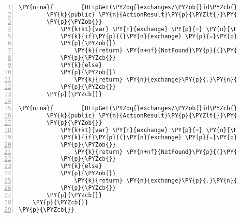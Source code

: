 \begin{Verbatim}[commandchars=\\\{\},numbers=left,firstnumber=1,stepnumber=1,numberblanklines=0]
\PY{n+na}{        [HttpGet(\PYZdq{}exchanges/\PYZob{}id\PYZcb{}/stats/endDate/\PYZob{}endDate\PYZcb{}\PYZdq{})]}
        \PY{k}{public} \PY{n}{ActionResult}\PY{p}{\PYZlt{}}\PY{n}{List}\PY{p}{\PYZlt{}}\PY{n}{Stat}\PY{p}{\PYZgt{}}\PY{p}{\PYZgt{}} \PY{n}{GetByEndDate}\PY{p}{(}\PY{k+kt}{int} \PY{n}{id}\PY{p}{,} \PY{n}{DateTime} \PY{n}{endDate}\PY{p}{)}
        \PY{p}{\PYZob{}}
            \PY{k+kt}{var} \PY{n}{exchange} \PY{p}{=} \PY{n}{\PYZus{}context}\PY{p}{.}\PY{n}{Exchanges}\PY{p}{.}\PY{n}{Where}\PY{p}{(}\PY{n}{e} \PY{p}{=}\PY{p}{\PYZgt{}} \PY{n}{e}\PY{p}{.}\PY{n}{ExchangeId}\PY{p}{=}\PY{p}{=} \PY{n}{id}\PY{p}{)}\PY{p}{.}\PY{n}{First}\PY{p}{(}\PY{p}{)}\PY{p}{;}
            \PY{k}{if}\PY{p}{(}\PY{n}{exchange} \PY{p}{=}\PY{p}{=} \PY{k}{null}\PY{p}{)}
            \PY{p}{\PYZob{}}
                \PY{k}{return} \PY{n+nf}{NotFound}\PY{p}{(}\PY{p}{)}\PY{p}{;}
            \PY{p}{\PYZcb{}}
            \PY{k}{else}
            \PY{p}{\PYZob{}}
                \PY{k}{return} \PY{n}{exchange}\PY{p}{.}\PY{n}{Stats}\PY{p}{.}\PY{n}{Where}\PY{p}{(}\PY{n}{s} \PY{p}{=}\PY{p}{\PYZgt{}} \PY{n}{s}\PY{p}{.}\PY{n}{endDate}\PY{p}{.}\PY{n}{Equals}\PY{p}{(}\PY{n}{endDate}\PY{p}{)}\PY{p}{)}\PY{p}{.}\PY{n}{ToList}\PY{p}{(}\PY{p}{)}\PY{p}{;}
            \PY{p}{\PYZcb{}}
        \PY{p}{\PYZcb{}}

\PY{n+na}{        [HttpGet(\PYZdq{}exchanges/\PYZob{}id\PYZcb{}/stats/dates/\PYZob{}startDate\PYZcb{}/\PYZob{}endDate\PYZcb{}\PYZdq{})]}
        \PY{k}{public} \PY{n}{ActionResult}\PY{p}{\PYZlt{}}\PY{n}{Stat}\PY{p}{\PYZgt{}} \PY{n}{GetByDates}\PY{p}{(}\PY{k+kt}{int} \PY{n}{id}\PY{p}{,} \PY{n}{DateTime} \PY{n}{startDate}\PY{p}{,} \PY{n}{DateTime} \PY{n}{endDate}\PY{p}{)}
        \PY{p}{\PYZob{}}
            \PY{k+kt}{var} \PY{n}{exchange} \PY{p}{=} \PY{n}{\PYZus{}context}\PY{p}{.}\PY{n}{Exchanges}\PY{p}{.}\PY{n}{Where}\PY{p}{(}\PY{n}{e} \PY{p}{=}\PY{p}{\PYZgt{}} \PY{n}{e}\PY{p}{.}\PY{n}{ExchangeId} \PY{p}{=}\PY{p}{=} \PY{n}{id}\PY{p}{)}\PY{p}{.}\PY{n}{First}\PY{p}{(}\PY{p}{)}\PY{p}{;}
            \PY{k}{if}\PY{p}{(}\PY{n}{exchange} \PY{p}{=}\PY{p}{=} \PY{k}{null}\PY{p}{)}
            \PY{p}{\PYZob{}}
                \PY{k}{return} \PY{n+nf}{NotFound}\PY{p}{(}\PY{p}{)}\PY{p}{;}
            \PY{p}{\PYZcb{}}
            \PY{k}{else}
            \PY{p}{\PYZob{}}
                \PY{k}{return} \PY{n}{exchange}\PY{p}{.}\PY{n}{Stats}\PY{p}{.}\PY{n}{Where}\PY{p}{(}\PY{n}{s} \PY{p}{=}\PY{p}{\PYZgt{}} \PY{n}{s}\PY{p}{.}\PY{n}{startDate}\PY{p}{.}\PY{n}{Equals}\PY{p}{(}\PY{n}{startDate}\PY{p}{)} \PY{p}{\PYZam{}}\PY{p}{\PYZam{}} \PY{n}{s}\PY{p}{.}\PY{n}{endDate}\PY{p}{.}\PY{n}{Equals}\PY{p}{(}\PY{n}{endDate}\PY{p}{)}\PY{p}{)}\PY{p}{.}\PY{n}{First}\PY{p}{(}\PY{p}{)}\PY{p}{;}
            \PY{p}{\PYZcb{}}
        \PY{p}{\PYZcb{}}
    \PY{p}{\PYZcb{}}
\PY{p}{\PYZcb{}}
\end{Verbatim}
